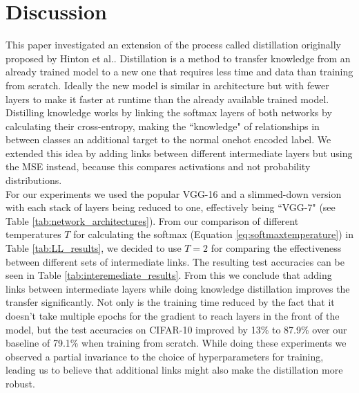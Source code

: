 \documentclass[10pt,twocolumn,letterpaper]{article}
\begin{document}



\section{Discussion}
This paper investigated an extension of the process called distillation originally proposed by Hinton et al.\cite{hinton2015distilling}. Distillation is a method to transfer knowledge from an already trained model to a new one that requires less time and data than training from scratch. Ideally the new model is similar in architecture but with fewer layers to make it faster at runtime than the already available trained model. Distilling knowledge works by linking the softmax layers of both networks by calculating their cross-entropy, making the ``knowledge" of relationships in between classes an additional target to the normal onehot encoded label. We extended this idea by adding links between different intermediate layers but using the MSE instead, because this compares activations and not probability distributions.\\
For our experiments we used the popular VGG-16 and a slimmed-down version with each stack of layers being reduced to one, effectively being ``VGG-7" (see Table \ref{tab:network_architectures}). From our comparison of different temperatures $T$ for calculating the softmax (Equation \ref{eq:softmaxtemperature}) in Table \ref{tab:LL_results}, we decided to use $T=2$ for comparing the effectiveness between different sets of intermediate links. The resulting test accuracies can be seen in Table \ref{tab:interemediate_results}. From this we conclude that adding links between intermediate layers while doing knowledge distillation improves the transfer significantly. Not only is the training time reduced by the fact that it doesn't take multiple epochs for the gradient to reach layers in the front of the model, but the test accuracies on CIFAR-10 \cite{krizhevsky2009learning} improved by 13\% to 87.9\% over our baseline of 79.1\% when training from scratch. While doing these experiments we observed a partial invariance to the choice of hyperparameters for training, leading us to believe that additional links might also make the distillation more robust.\\
\end{document}
